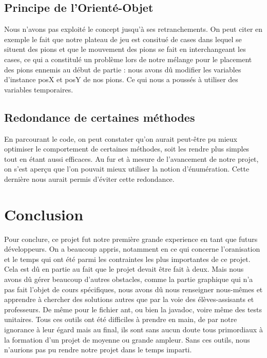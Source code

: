\documentclass[10pt]{article}
\begin{document}
\subsection{Principe de l'Orienté-Objet} 
 Nous n'avons pas exploité le concept jusqu'à ses retranchements. On peut citer en exemple le fait que notre plateau de jeu est consitué de cases dans lequel se situent des pions et que le mouvement des pions se fait en interchangeant les cases, ce qui a constitulé un problème lors de notre mélange pour le placement des pions ennemis au début de partie : nous avons dû modifier les variables d'instance posX et posY de nos pions. Ce qui nous a poussés à utiliser des variables temporaires.
\subsection{Redondance de certaines méthodes}
 En parcourant le code, on peut constater qu'on aurait peut-être pu mieux optimiser le comportement de certaines méthodes, soit les rendre plus simples tout en étant aussi efficaces. Au fur et à mesure de l'avancement de notre projet, on s'est aperçu que l'on pouvait mieux utiliser la notion d'énumération. Cette dernière nous aurait permis d'éviter cette redondance.   
 
\section{Conclusion}

Pour conclure, ce projet fut notre première grande experience en tant que futurs développeurs. On a beaucoup appris, notamment en ce qui concerne l'oranisation et le temps qui ont été parmi les contraintes les plus importantes de ce projet. Cela est dû en partie au fait que le projet devait être fait à deux. Mais nous avons dû gérer beaucoup d'autres obstacles, comme la partie graphique qui n'a pas fait l'objet de cours spécifiques, nous avons dû nous renseigner nous-mêmes et apprendre à chercher des solutions autres que par la voie des élèves-assisants et professeurs. De même pour le fichier ant, ou bien la javadoc, voire même des tests unitaires. Tous ces outils ont été difficiles à prendre en main, de par notre ignorance à leur égard mais au final, ils sont sans aucun doute tous primordiaux à la formation d'un projet de moyenne ou grande ampleur. Sans ces outils, nous n'aurions pas pu rendre notre projet dans le temps imparti.
\end{document}
